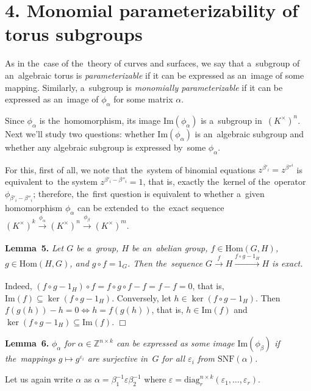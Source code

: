 \documentclass[twoside]{article}
\begin{document}
\section*{4. Monomial parameterizability of torus subgroups}

As in the~case of the~theory of curves and surfaces, we say that a~subgroup of an~algebraic torus
is \textit{parameterizable} if it can be expressed as an~image of some mapping. Similarly, a~subgroup
is \textit{monomially parameterizable} if it can be expressed as an~image of $\phi_\alpha$ for some matrix $\alpha$.

Since $\phi_\alpha$ is the~homomorphism, its image $\mathrm{Im}(\phi_\alpha)$ is a~subgroup in~$(K^\times)^n$.
Next we'll study two questions: whether $\mathrm{Im}(\phi_\alpha)$ is an~algebraic subgroup and whether
any algebraic subgroup is expressed by~some $\phi_\alpha$.

For this, first of all, we note that the~system of binomial equations $z^{\beta'_i} = z^{\beta''^i}$ is equivalent
to~the system $z^{\beta'_i - \beta''_i} = 1$, that is, exactly the~kernel of the~operator $\phi_{\beta'_i - \beta''_i}$;
therefore, the~first question is equivalent to whether a~given homomorphism $\phi_\alpha$ can be extended
to~the~exact sequence $(K^\times)^k \xrightarrow[]{\phi_\alpha} (K^\times)^n \xrightarrow[]{\phi_\beta} (K^\times)^m$.

\medskip\noindent\textbf{Lemma~5.}\emph{
    Let $G$ be a~group, $H$ be an~abelian group, $f \in \mathrm{Hom}(G, H)$, $g \in \mathrm{Hom}(H, G)$, and $g \circ f = 1_G$.
    Then the~sequence $G \xrightarrow[]{f} H \xrightarrow[]{f \circ g - 1_H} H$ is exact.
}\medskip

    Indeed, $(f \circ g - 1_H) \circ f = f \circ g \circ f - f = f - f = 0$, that is, $\mathrm{Im}(f) \subseteq \ker(f \circ g - 1_H)$.
    Conversely, let $h \in \ker(f \circ g - 1_H)$. Then $f(g(h)) - h = 0 \Leftrightarrow h = f(g(h))$, that is, $h \in \mathrm{Im}(f)$
    and $\ker(f \circ g - 1_H) \subseteq \mathrm{Im}(f)$.
\hfill$\Box$\medskip

\medskip\noindent\textbf{Lemma~6.}\emph{
    $\phi_\alpha$ for $\alpha \in \mathbb{Z}^{n \times k}$ can be expressed as some image $\mathrm{Im}(\phi_\beta)$
    if the~mappings $g \mapsto g^{\varepsilon_i}$ are surjective in~$G$ for all $\varepsilon_i$ from $\mathrm{SNF}(\alpha)$.
}\medskip

    Let us again write $\alpha$ as $\alpha = \beta_1^{-1} \varepsilon \beta_2^{-1}$ where
    $
        \varepsilon = \mathrm{diag}^{n \times k}_r(\varepsilon_1, \ldots, \varepsilon_r).
    $
\end{document}
